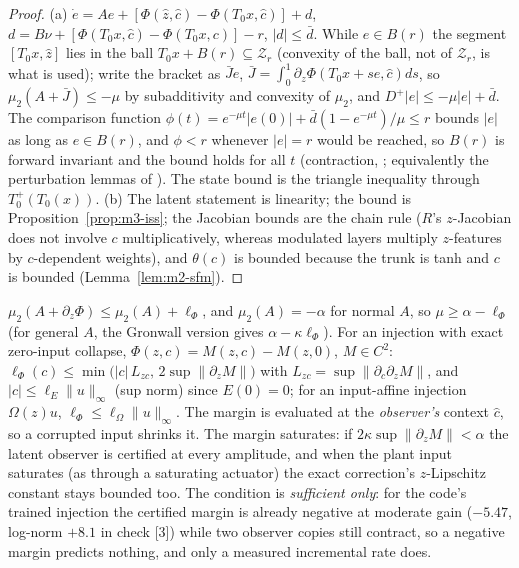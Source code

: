 \begin{proof}
(a) $\dot e=Ae+[\Phi(\hat z,\hat c)-\Phi(T_0x,\hat c)]+d$, $d=B\nu+[\Phi(T_0x,\hat c)-\Phi(T_0x,c)]-r$, $|d|\le\bar d$. While
$e\in B(r)$ the segment $[T_0x,\hat z]$ lies in the ball $T_0x+B(r)\subseteq\mathcal Z_r$ (convexity of the ball,
not of $\mathcal Z_r$, is what is used); write the bracket as $\bar Je$,
$\bar J=\int_0^1\partial_z\Phi(T_0x+se,\hat c)ds$, so $\mu_2(A+\bar J)\le-\mu$ by subadditivity and convexity of $\mu_2$,
and $D^+|e|\le-\mu|e|+\bar d$. The comparison function $\phi(t)=e^{-\mu t}|e(0)|+\bar d(1-e^{-\mu t})/\mu\le r$ bounds
$|e|$ as long as $e\in B(r)$, and $\phi<r$ whenever $|e|=r$ would be reached, so $B(r)$ is forward invariant and the
bound holds for all $t$ (contraction, \citealp{lohmiller1998contraction}; equivalently the perturbation lemmas of
\citealp[Ch.~9]{khalil2002nonlinear}). The state bound is the triangle inequality through $T_0^+(T_0(x))$.
(b) The latent statement is linearity; the bound is Proposition~\ref{prop:m3-iss}; the Jacobian bounds are the chain rule
($R$'s $z$-Jacobian does not involve $c$ multiplicatively, whereas modulated layers multiply $z$-features by $c$-dependent
weights), and $\theta(c)$ is bounded because the trunk is tanh and $c$ is bounded (Lemma~\ref{lem:m2-sfm}).
\end{proof}

\begin{corollary}\label{cor:m1-amplitude}
$\mu_2(A+\partial_z\Phi)\le\mu_2(A)+\ell_\Phi$, and $\mu_2(A)=-\alpha$ for normal $A$, so $\mu\ge\alpha-\ell_\Phi$
(for general $A$, the Gronwall version gives $\alpha-\kappa\ell_\Phi$). For an injection with exact zero-input
collapse, $\Phi(z,c)=M(z,c)-M(z,0)$, $M\in C^2$: $\ell_\Phi(c)\le\min\big(|c|\,L_{zc},\,2\sup\|\partial_zM\|\big)$ with
$L_{zc}=\sup\|\partial_c\partial_zM\|$, and $|c|\le\ell_E\|u\|_\infty$ (sup norm) since $E(0)=0$; for an input-affine
injection $\Omega(z)u$, $\ell_\Phi\le\ell_\Omega\|u\|_\infty$. The margin is evaluated at the \emph{observer's} context
$\hat c$, so a corrupted input shrinks it. The margin saturates: if $2\kappa\sup\|\partial_zM\|<\alpha$ the latent observer
is certified at every amplitude, and when the plant input saturates (as through a saturating actuator) the exact
correction's $z$-Lipschitz constant stays bounded too. The condition is \emph{sufficient only}: for the code's trained
injection the certified margin is already negative at moderate gain ($-5.47$, log-norm $+8.1$ in check [3]) while two
observer copies still contract, so a negative margin predicts nothing, and only a measured incremental rate does.
\end{corollary}

